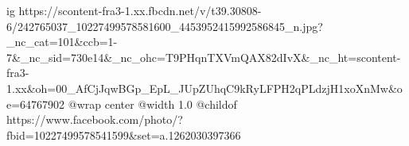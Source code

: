  
 
 
 
 

\ifcmt
  ig https://scontent-fra3-1.xx.fbcdn.net/v/t39.30808-6/242765037_10227499578581600_4453952415992586845_n.jpg?_nc_cat=101&ccb=1-7&_nc_sid=730e14&_nc_ohc=T9PHqnTXVmQAX82dIvX&_nc_ht=scontent-fra3-1.xx&oh=00_AfCjJqwBGp_EpL_JUpZUhqC9kRyLFPH2qPLdzjH1xoXnMw&oe=64767902
  @wrap center
  @width 1.0
  @childof https://www.facebook.com/photo/?fbid=10227499578541599&set=a.1262030397366
\fi
